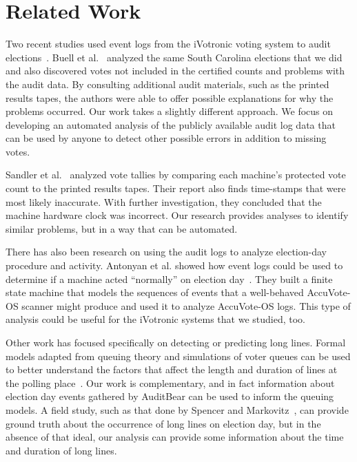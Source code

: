 \documentclass[letterpaper,twocolumn,10pt]{article}
\begin{document}
 \section{Related Work}
Two recent studies used event logs from the iVotronic voting system to audit
elections~\cite{Buell2011, Sandler2007}. Buell et al.~\cite{Buell2011} analyzed
the same South Carolina elections that we did and also discovered votes not
included in the certified counts and problems with the audit data. By consulting
additional audit materials, such as the printed results tapes, the authors were
able to offer possible explanations for why the problems occurred. Our work
takes a slightly different approach. We focus on developing an automated
analysis of the publicly available audit log data that can be used by
anyone to detect other possible errors in addition to missing votes.   

Sandler et al.~\cite{Sandler2007} analyzed vote tallies by comparing each
machine's protected vote count to the printed results tapes. Their report also
finds time-stamps that were most likely inaccurate. With further investigation,
they concluded that the machine hardware clock was incorrect. Our research
provides analyses to identify similar problems, but in a way that can be
automated.   

There has also been research on using the audit logs to analyze election-day
procedure and activity. Antonyan et al. showed how event logs could be used to
determine if a machine acted ``normally'' on election
day~\cite{Antonyan2009}. They built a finite state machine that models the
sequences of events that a well-behaved AccuVote-OS scanner might produce and
used it to analyze AccuVote-OS logs. This type of analysis could be useful for
the iVotronic systems that we studied, too.  

Other work has focused specifically on detecting or predicting long
lines. Formal models adapted from queuing theory and simulations of voter queues
can be used to better understand the factors that affect the length and duration
of lines at the polling place~\cite{Allen2006, Edel2010}. Our work is
complementary, and in fact information about election day events gathered by
AuditBear can be used to inform the queuing models. A field study, such as that
done by Spencer and Markovitz~\cite{Spencer2010}, can provide ground truth about
the occurrence of long lines on election day, but in the absence of that ideal,
our analysis can provide some information about the time and duration of long
lines. 
\end{document}
